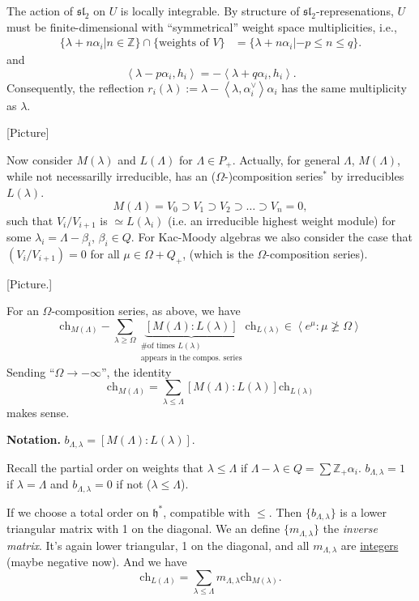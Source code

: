 The action of $\mathfrak{sl}_2$ on $U$ is
locally integrable. By structure of
$\mathfrak{sl}_2$-represenations, $U$ must be
finite-dimensional
with ``symmetrical'' weight space
multiplicities, i.e.,
$$
\begin{aligned}
\{\lambda+n\alpha_i|n\in\mathbb{Z}\}\cap
\{\text{weights of }V\}
&=\{\lambda+n\alpha_i|-p\leq n\leq q\}.
\end{aligned}
$$
and
$$
\left\langle{}\lambda-p\alpha_i,h_i\right\rangle{}=-
\left\langle{}\lambda+q\alpha_i,h_i\right\rangle{}.
$$
\medskip\noindent
Consequently, the reflection
$r_i(\lambda):=\lambda-\left\langle{}\lambda,
\alpha_i^\vee\right\rangle{}\alpha_i$
has the same multiplicity as $\lambda$.

[Picture]

Now consider $M(\lambda)$ and $L(\Lambda)$
for
$\Lambda \in P_+$.
Actually, for general $\Lambda$,
$M(\Lambda)$, while not
necessarilly irreducible, has an
($\Omega$-)composition series$^*$ by
irreducibles $L(\lambda)$.
$$
M(\Lambda)=V_0 \supset V_1 \supset V_2
\supset \ldots \supset V_n=0,
$$
such that $V_i/V_{i+1}$ is $\simeq
L(\lambda_i)$ (i.e. an irreducible highest
weight module) for some
$\lambda_i=\Lambda-\beta_i$, $\beta_i \in Q$.
For
Kac-Moody algebras we also consider the case
that $(V_i/V_{i+1})=0$ for all
$\mu \in \Omega + Q_+$, (which is the
$\Omega$-composition series).

[Picture.]

For an $\Omega$-composition series, as above,
we have
$$
\text{ch}_{M(\Lambda)}-\sum_{\lambda \geq
\Omega}
\underbrace{[M(\Lambda):L(\lambda)]}
_{\substack{\text{\# of times $L(\lambda)$}
\\ \text{
appears in the compos. series}}}
\text{ch}_{L(\lambda)}
\in \left\langle{}e^{\mu}:\mu \not \geq \Omega\right\rangle{}
$$
Sending  ``$\Omega \to -\infty$'', the
identity
$$
\text{ch}_{M(\Lambda)}=\sum_{\lambda \leq
\Lambda}
[M(\Lambda):L(\lambda)]\text{ch}_{L(\lambda)}
$$
makes sense.

{\bf Notation.}
$b_{\Lambda,\lambda}=[M(\Lambda):L(\lambda)]
$.

\begin{remark}
\label{remark-total-order-on-hstar}
Recall the partial order on weights that
$\lambda \leq \Lambda$ if
$\Lambda-\lambda \in Q= \sum
\mathbb{Z}_+\alpha_i$.
$b_{\Lambda,\lambda}=1$ if $\lambda =
\Lambda$ and
$b_{\Lambda,\lambda}=0$ if not ($\lambda \leq
\Lambda$).

If we choose a total order on
$\mathfrak{h}^*$, compatible with $\leq$.
Then $\{b_{\Lambda,\lambda}\}$ is a lower
triangular matrix with 1
on the diagonal.
We an define $\{m_{\Lambda,\lambda}\}$ the
{\it inverse matrix}.
It's again lower triangular, 1 on the
diagonal, and all
$m_{\Lambda,\lambda}$ are
\underline{integers} (maybe negative now).
And we have
\begin{equation}
\label{equation-character}
\text{ch}_{L(\Lambda)}=\sum_{\lambda \leq
\Lambda}m_{\Lambda,\lambda}
\text{ch}_{M(\lambda)}.
\end{equation}
\end{remark}

